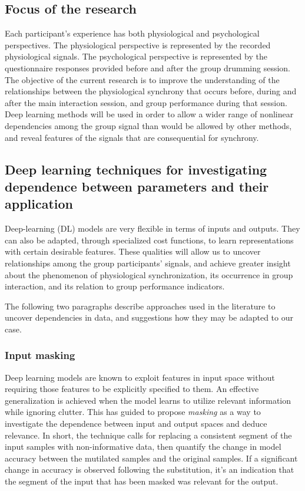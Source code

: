 \documentclass[a4paper, 11pt]{article}      %
\begin{document}
\subsection{Focus of the research}
Each participant's experience has both physiological and psychological perspectives. The physiological perspective is represented by the recorded physiological signals. The psychological perspective is represented by the questionnaire responses provided before and after the group drumming session. The objective of the current research is to improve the understanding of the relationships between the physiological synchrony that occurs before, during and after the main interaction session, and group performance during that session. Deep learning methods will be used in order to allow a wider range of nonlinear dependencies among the group signal than would be allowed by other methods,
and reveal features of the signals that are consequential for synchrony.



\subsection{Deep learning techniques for investigating dependence between parameters and their application}

Deep-learning (DL) models are very flexible in terms of inputs and outputs. They can also be adapted, through specialized cost functions, to learn representations with certain desirable features. These qualities will allow us to uncover relationships among the group participants' signals, and achieve greater insight about the phenomenon of physiological synchronization, its occurrence in group interaction, and its relation to group performance indicators.

The following two paragraphs describe approaches used in the literature to uncover dependencies in data, and suggestions how they may be adapted to our case.

\subsubsection{Input masking}
Deep learning models are known to exploit features in input space without requiring those features to be explicitly specified to them. An effective generalization is achieved when the model learns to utilize relevant information while ignoring clutter. This has guided \cite{williams2019demystifying} to propose \emph{masking} as a way to investigate the dependence between input and output spaces and deduce relevance. In short, the technique calls for replacing a consistent segment of the input samples with non-informative data, then quantify the change in model accuracy between the mutilated samples and the original samples. If a significant change in accuracy is observed following the substitution, it's an indication that the segment of the input that has been masked was relevant for the output.
\end{document}
